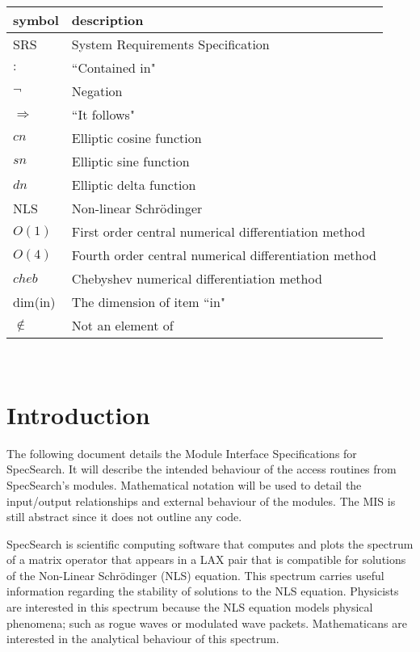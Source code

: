 \documentclass[12pt, titlepage]{article}
\begin{document}
\renewcommand{\arraystretch}{1.2}
\begin{tabular}{l l} 
	\toprule		
	\textbf{symbol} & \textbf{description}\\
	\midrule 
	SRS & System Requirements Specification\\ 
	$:$ & ``Contained in"\\ 
	$\neg$ & Negation\\ 
	$\Rightarrow$ & ``It follows"\\ 
	$cn$ & Elliptic cosine function\\ 
	$sn$ & Elliptic sine function\\ 
	$dn$ & Elliptic delta function \\ 
	NLS & Non-linear Schr\"{o}dinger\\  
	$O(1)$ & First order central numerical differentiation method \\ 
	$O(4)$ & Fourth order central numerical differentiation method \\ 
	$cheb$ & Chebyshev numerical differentiation method\\
	dim(in) & The dimension of item ``in" \\
	$\notin$ & Not an element of\\
	\bottomrule
\end{tabular}\\

\newpage

\tableofcontents

\newpage


\section{Introduction}

The following document details the Module Interface Specifications for
SpecSearch. It will describe the intended behaviour of the 
access routines from SpecSearch's modules. Mathematical notation 
will be used to detail the input/output relationships and external behaviour 
of the modules. The MIS is still abstract since it does not outline any code. 

SpecSearch is scientific computing software that computes and plots 
the spectrum of a matrix operator that appears in a LAX pair that is compatible 
for solutions of the Non-Linear Schr\"{o}dinger (NLS) equation. 
This spectrum carries useful information regarding the stability 
of solutions to the NLS equation. Physicists are interested in this spectrum 
because 
the NLS equation models physical phenomena; such as rogue waves or 
modulated wave packets. Mathematicans are interested in the analytical 
behaviour of this spectrum. 
\end{document}
